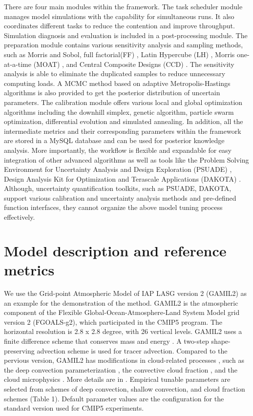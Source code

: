 \documentclass[gmd, manuscript]{copernicus}
\begin{document}
There are four main modules within the framework. The task scheduler module manages model simulations with the capability for simultaneous runs. It also coordinates different tasks to reduce the contention and improve throughput. Simulation diagnosis and evaluation is included in a post-processing module.  The preparation module contains various sensitivity analysis and sampling methods, such as Morris and Sobol, full factorial(FF) \citep{raktoe1981factorial}, Latin Hypercube (LH) \citep{mckay1979comparison}, Morris one-at-a-time (MOAT) \citep{morris1991factorial}, and Central Composite Designs (CCD) \citep{hader1978slope}. The sensitivity analysis is able to eliminate the duplicated samples to reduce unnecessary computing loads. A MCMC method based on adaptive Metropolis-Hastings algorithms is also provided to get the posterior distribution of uncertain parameters. The calibration module offers various local and global optimization algorithms including the downhill simplex, genetic algorithm, particle swarm optimization, differential evolution and simulated annealing. In addition, all the intermediate metrics and their corresponding parameters within the framework are stored in a MySQL database and can be used for posterior knowledge analysis. More importantly, the workflow is flexible and expandable for easy integration of other advanced algorithms as well as tools like the Problem Solving Environment for Uncertainty Analysis and Design Exploration (PSUADE) \citep{tong2005psuade}, Design Analysis Kit for Optimization and Terascale Applications (DAKOTA) \citep{eldred2007investigation}. Although, uncertainty quantification toolkits, such as PSUADE, DAKOTA, support various calibration and uncertainty analysis methods and pre-defined function interfaces,  they cannot organize the above model tuning process effectively.


\section{Model description and reference metrics}
We use the Grid-point Atmospheric Model of IAP LASG version 2 (GAMIL2) as an example for the demonstration of the method. GAMIL2 is the atmospheric component of the Flexible Global-Ocean-Atmosphere-Land System Model grid version 2 (FGOALS-g2), which participated in the CMIP5 program. The horizontal resolution is 2.8 x 2.8 degree, with 26 vertical levels. GAMIL2 uses a finite difference scheme that conserves mass and energy \citep{wang2004design}. A two-step shape-preserving advection scheme \citep{rucong1994two} is used for tracer advection. Compared to the pervious version, GAMIL2 has modifications in cloud-related processes \citep{li2013evaluation}, such as the deep convection parameterization \citep{zhang2005effects}, the convective cloud fraction \citep{xu1991evaluation}, and the cloud microphysics \citep{morrison2008new}. More details are in \cite{li2013evaluation}. Empirical tunable parameters are selected  from schemes of deep convection, shallow convection, and cloud fraction schemes (Table 1). Default parameter values are the configuration for the standard version used for CMIP5 experiments.
\end{document}

